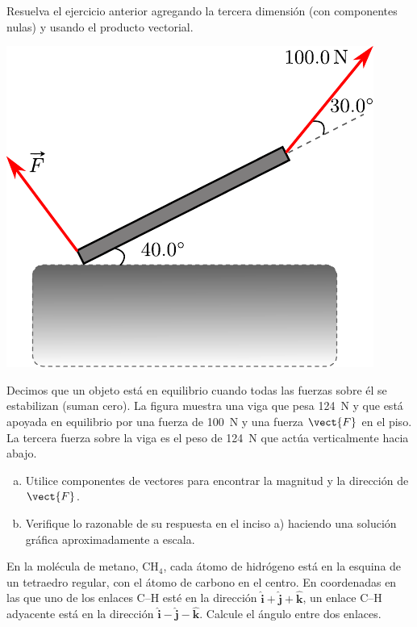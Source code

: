 \documentclass[11pt]{article}
\begin{document}
\begin{exercise}
    Resuelva el ejercicio anterior agregando la tercera dimensión (con componentes nulas) y usando el producto vectorial.
\end{exercise}

\begin{exercise}
    \begin{multicols}{2}
        \includegraphics[scale=0.90]{figs/fig-09.pdf}

        Decimos que un objeto está en equilibrio cuando todas las fuerzas sobre él se estabilizan (suman cero). La figura muestra una viga que pesa \qty{124}{N} y que está apoyada en equilibrio por una fuerza de \qty{100}{N} y una fuerza $\vect{F}$ en el piso. La tercera fuerza sobre la viga es el peso de \qty{124}{N} que actúa verticalmente hacia abajo.
        \begin{enumerate}[a)]
            \item Utilice componentes de vectores para encontrar la magnitud y la dirección de $\vect{F}$.
            \item Verifique lo razonable de su respuesta en el inciso a) haciendo una solución gráfica aproximadamente a escala.
        \end{enumerate}
    \end{multicols}
\end{exercise}

\begin{exercise}
    En la molécula de metano, CH$_4$, cada átomo de hidrógeno está en la esquina de un tetraedro regular, con el átomo de carbono en el centro. En coordenadas en las que uno de los enlaces C--H esté en la dirección $\hat{\bm{i}} + \hat{\bm{j}} +\hat{\bm{k}}$, un enlace C--H adyacente está en la dirección  $\hat{\bm{i}} - \hat{\bm{j}} -\hat{\bm{k}}$. Calcule el ángulo entre dos enlaces.
\end{exercise}
\end{document}
